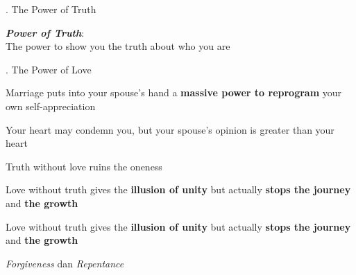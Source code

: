 \documentclass{beamer}
\begin{document}
\begin{frame}{}
	\LARGE
	. The Power of Truth
\end{frame}


\begin{frame}{}
	\LARGE
	\centering
	\textit{\textbf{Power of Truth}}:\\ 
	The power to show you the truth about who you are
\end{frame}


\begin{frame}{}
	\LARGE
	. The Power of Love
\end{frame}

\begin{frame}{}
	\LARGE
	\centering
	Marriage puts into your spouse's hand a \textbf{massive power to reprogram} your own self-appreciation
\end{frame}


\begin{frame}{}
	\LARGE
	\centering
	Your heart may condemn you, but your spouse's opinion is greater than your heart
\end{frame}

\begin{frame}{}
	\LARGE
	\centering
	Truth without love ruins the oneness
\end{frame}

\begin{frame}{}
	\LARGE
	\centering
	Love without truth gives the \textbf{illusion of unity} but actually \textbf{stops the journey} and \textbf{the growth}
\end{frame}

\begin{frame}{}
	\LARGE
	\centering
	Love without truth gives the \textbf{illusion of unity} but actually \textbf{stops the journey} and \textbf{the growth}
\end{frame}

\begin{frame}{}
	\LARGE
	\centering
	\textit{Forgiveness} dan \textit{Repentance}
\end{frame}
\end{document}
